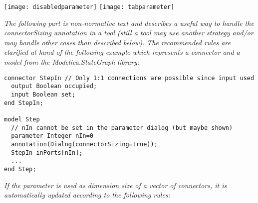 \texttt{[image: disabledparameter]}
\texttt{[image: tabparameter]}

\emph{The following part is non-normative text and describes a useful
way to handle the connectorSizing annotation in a tool (still a tool may
use another strategy and/or may handle other cases than described
below). The recommended rules are clarified at hand of the following
example which represents a connector and a model from the
Modelica.StateGraph library:}

\begin{lstlisting}[language=modelica]
connector StepIn // Only 1:1 connections are possible since input used
  output Boolean occupied;
  input Boolean set;
end StepIn;

model Step
  // nIn cannot be set in the parameter dialog (but maybe shown)
  parameter Integer nIn=0
  annotation(Dialog(connectorSizing=true));
  StepIn inPorts[nIn];
  ...
end Step;
\end{lstlisting}
\emph{If the parameter is used as dimension size of a {vector of
connectors}, it is automatically updated according to the following
rules:}


